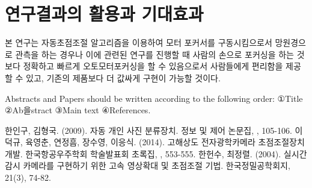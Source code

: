 \documentclass{abstract_hutech}
\begin{document}
\section{연구결과의 활용과 기대효과}

본 연구는 자동초점조절 알고리즘을 이용하여 모터 포커서를 구동시킴으로서 망원경으로 관측을 하는 경우나 이에 관련된 연구를 진행할 때 사람의 손으로 포커싱을 하는 것보다 정확하고 빠르게 오토모터포커싱을 할 수 있음으로서 사람들에게 편리함을 제공할 수 있고, 기존의 제품보다 더 값싸게 구현이 가능할 것이다.

Abstracts and Papers should be written according to the following order: ①Title ②Ab을stract ③Main text ④References.

\begin{thebibliography}{99}
 한인구, 김형국. (2009). 자동 개인 사진 분류장치. 정보 및 제어 논문집, , 105-106.
 이덕규, 육영춘, 연정흠, 장수영, 이응식. (2014). 고해상도 전자광학카메라 초점조절장치 개발. 한국항공우주학회 학술발표회 초록집, , 553-555.
 한헌수, 최정렬. (2004). 실시간 감시 카메라를 구현하기 위한 고속 영상확대 및 초점조절 기법. 한국정밀공학회지, 21(3), 74-82.
\end{thebibliography}

\begin{thebibliography}{99}
	
\end{thebibliography}
\end{document}
